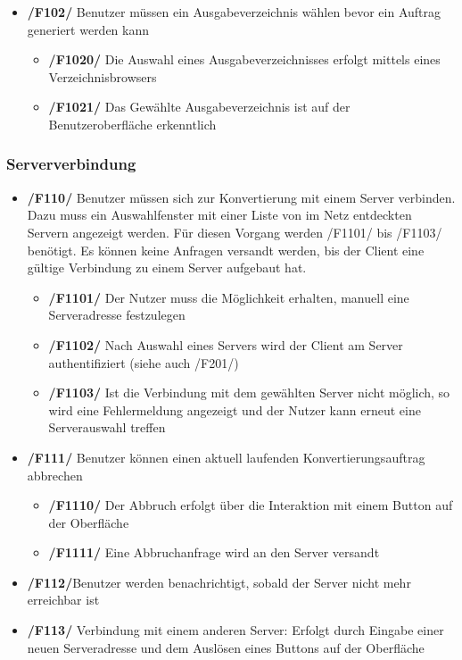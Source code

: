 \documentclass[11pt]{article} %
\begin{document}
\begin{itemize}
\begin{itemize}
\end{itemize}

\item{\textbf{/F102/} Benutzer müssen ein Ausgabeverzeichnis wählen bevor ein Auftrag generiert werden kann}

\begin{itemize}
\item{\textbf{/F1020/} Die Auswahl eines Ausgabeverzeichnisses erfolgt mittels eines Verzeichnisbrowsers}
\item{\textbf{/F1021/} Das Gewählte Ausgabeverzeichnis ist auf der Benutzeroberfläche erkenntlich}
\end{itemize}

\end{itemize}

\subsubsection{Serververbindung}

\begin{itemize}
\item{\textbf{/F110/} Benutzer müssen sich zur Konvertierung mit einem Server verbinden. Dazu muss ein Auswahlfenster mit einer Liste von im Netz entdeckten Servern angezeigt werden. Für diesen Vorgang werden /F1101/ bis /F1103/ benötigt. Es können keine Anfragen versandt werden, bis der Client eine gültige Verbindung zu einem Server aufgebaut hat.}

\begin{itemize}
\item{\textbf{/F1101/} Der Nutzer muss die Möglichkeit erhalten, manuell eine Serveradresse festzulegen}
\item{\textbf{/F1102/} Nach Auswahl eines Servers wird der Client am Server authentifiziert (siehe auch /F201/)}
\item{\textbf{/F1103/} Ist die Verbindung mit dem gewählten Server nicht möglich, so wird eine Fehlermeldung angezeigt und der Nutzer kann erneut eine Serverauswahl treffen}
\end{itemize}

\item{\textbf{/F111/} Benutzer können einen aktuell laufenden Konvertierungsauftrag abbrechen}

\begin{itemize}
\item{\textbf{/F1110/} Der Abbruch erfolgt über die Interaktion mit einem Button auf der Oberfläche}
\item{\textbf{/F1111/} Eine Abbruchanfrage wird an den Server versandt}
\end{itemize}

\item{\textbf{/F112/}Benutzer werden benachrichtigt, sobald der Server nicht mehr erreichbar ist}

\item{\textbf{/F113/} Verbindung mit einem anderen Server: Erfolgt durch Eingabe einer neuen Serveradresse und dem Auslösen eines Buttons auf der Oberfläche}

\end{itemize}
\end{document}
